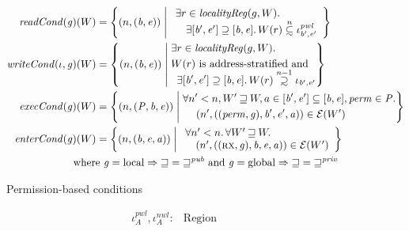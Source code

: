 \documentclass[format=acmsmall, review=true, screen=true]{acmart}
\newcommand\subsetsim{\mathrel{\ooalign{\raise.2ex\hbox{$\subset$}\cr
      \hidewidth\lower.8ex\hbox{\scalebox{0.9}{$\sim$}}\hidewidth\cr}}}
\newcommand\supsetsim{\mathrel{\ooalign{\raise.2ex\hbox{$\supset$}\cr
      \hidewidth\lower.8ex\hbox{\scalebox{0.9}{$\sim$}}\hidewidth\cr}}}
\newcommand{\nsubsim}[1][n]{\stackrel{\tiny{#1}}{\subsetsim}}
\newcommand{\nsupsim}[1][n]{\stackrel{\tiny{#1}}{\supsetsim}}
\newcommand{\var}[1]{\mathit{#1}}
\newcommand{\gl}{\var{g}}
\newcommand{\addr}{\var{a}}
\newcommand{\start}{\var{b}}
\newcommand{\addrend}{\var{e}}
\newcommand{\perm}{\var{perm}}
\newcommand{\nwl}{\var{nwl}}
\newcommand{\pwl}{\var{pwl}}
\newcommand{\plainfun}[2]{
  \ifthenelse{\equal{#2}{}}
  {\mathit{#1}}
  {\mathit{#1}(#2)}
}
\newcommand{\readCond}[1]{\plainfun{readCond}{#1}}
\newcommand{\writeCond}[1]{\plainfun{writeCond}{#1}}
\newcommand{\execCond}[1]{\plainfun{execCond}{#1}}
\newcommand{\entryCond}[1]{\plainfun{enterCond}{#1}}
\newcommand{\future}{\mathbin{\sqsupseteq}}
\newcommand{\futurewk}{\mathbin{\sqsupseteq}^{\var{pub}}}
\newcommand{\futurestr}{\mathbin{\sqsupseteq}^{\var{priv}}}
\newcommand{\asmType}{\plaindom{AsmType}}
\newcommand{\plaindom}[1]{\mathrm{#1}}
\newcommand{\Regions}{\plaindom{Region}}
\newcommand{\intr}[2]{\mathcal{#1}}
\newcommand{\exprintr}[1]{\intr{E}{#1}}
\newcommand{\stder}{\exprintr{\asmType}}
\newcommand{\npair}[2][n]{\left(#1,#2 \right)}
\newcommand{\npairP}[2][n]{(#1,#2)}
\newcommand{\plainperm}[1]{\textsc{#1}}
\newcommand{\exec}{\plainperm{rx}}
\newcommand{\plainlocality}[1]{\mathrm{#1}}
\newcommand{\local}{\plainlocality{local}}
\newcommand{\glob}{\plainlocality{global}}
\begin{document}
{\begin{figure}[htb]
  \centering
  \begin{align*}
   \readCond{}(\gl)(W) &=  \left\{ \npair{(\start,\addrend)} \; \middle| \;
    \begin{array}{l}
       \exists r \in \var{localityReg}(g,W) \ldotp \\
\quad   \exists [\start',\addrend'] \supseteq [\start,\addrend] \ldotp W(r)\nsubsim[n] \iota_{\start',\addrend'}^\pwl 
    \end{array}
    \right\}\\
   \writeCond{}(\iota,\gl)(W) &=  \left\{
    \npair{(\start,\addrend)}
    \; \middle| \;
    \begin{aligned}
      & \exists r \in \var{localityReg}(g,W) \ldotp \\
      & W(r) \text{ is address-stratified and} \\[-0.2cm]
      & \;\; \exists [\start',\addrend'] \supseteq [\start,\addrend] \ldotp W(r)\nsupsim[n-1] \iota_{\start',\addrend'}
    \end{aligned} \right\}\\
   \execCond{}(\gl)(W) &= 
    \left\{
      \npairP{(\var{P}, \start,\addrend)}
     \; \middle| \;
    \begin{aligned}
      & \forall n' < n, W' \future W, a \in [\start',\addrend'] \subseteq [\start,\addrend], \perm \in \var{P} \ldotp \\
      & \;\;\;\; \npair[n']{((\perm,\gl),\start',\addrend',\addr)} \in \stder(W')\\
    \end{aligned} \right\} \\
   \entryCond{}(\gl)(W) &= 
    \left\{ \npair{(\start,\addrend,\addr)} \; \middle| \;
    \begin{array}{l}
      \forall n' < n \ldotp \forall W' \future W \ldotp\\
      \quad \npair[n']{((\exec,\gl),\start,\addrend,\addr)} \in \stder(W')
    \end{array}
    \right\} \\
   \text{where } \gl = \local \Rightarrow \future = \futurewk \text{ and } \gl = \glob \Rightarrow \future = \futurestr \span
   \end{align*}
\caption{Permission-based conditions}
\label{fig:perm-conds}
\end{figure}
\begin{figure}[htb]
  \begin{align*}
  \iota^\pwl_A, \iota^\nwl_A :{} & \Regions \\

\end{align*}
\end{figure}}
\end{document}
